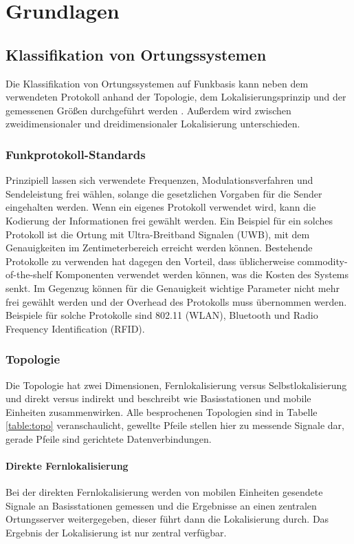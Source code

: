 \chapter{Grundlagen}
\label{ch:Grundlagen}

\section{Klassifikation von Ortungssystemen}
\label{ch:Einleitung:sec:Ortungssysteme}
Die Klassifikation von Ortungssystemen auf Funkbasis kann neben dem verwendeten Protokoll anhand der Topologie, dem Lokalisierungsprinzip und der gemessenen Größen durchgeführt werden \cite{liu2007survey}.
Außerdem wird zwischen zweidimensionaler und dreidimensionaler Lokalisierung unterschieden.

\subsection{Funkprotokoll-Standards}
Prinzipiell lassen sich verwendete Frequenzen, Modulationsverfahren und Sendeleistung frei wählen, solange die gesetzlichen Vorgaben für die Sender eingehalten werden. Wenn ein eigenes Protokoll verwendet wird, kann die Kodierung der Informationen frei gewählt werden. 
Ein Beispiel für ein solches Protokoll ist die Ortung mit Ultra-Breitband Signalen (UWB), mit dem Genauigkeiten im Zentimeterbereich erreicht werden können. Bestehende Protokolle zu verwenden hat dagegen den Vorteil, dass üblicherweise commodity-of-the-shelf Komponenten verwendet werden können, was die Kosten des Systems senkt. Im Gegenzug können für die Genauigkeit wichtige Parameter nicht mehr frei gewählt werden und der Overhead des Protokolls muss übernommen werden. Beispiele für solche Protokolle sind 802.11 (WLAN), Bluetooth und Radio Frequency Identification (RFID).

\subsection{Topologie}
Die Topologie hat zwei Dimensionen, Fernlokalisierung versus Selbstlokalisierung und direkt versus indirekt und beschreibt wie Basisstationen und mobile Einheiten zusammenwirken. 
Alle besprochenen Topologien sind in Tabelle \ref{table:topo} veranschaulicht, gewellte Pfeile stellen hier zu messende Signale dar, gerade Pfeile sind gerichtete Datenverbindungen.\\

\subsubsection{Direkte Fernlokalisierung} 
Bei der direkten Fernlokalisierung werden von mobilen Einheiten gesendete Signale an Basisstationen gemessen und die Ergebnisse an einen zentralen Ortungsserver weitergegeben, dieser führt dann die Lokalisierung durch. Das Ergebnis der Lokalisierung ist nur zentral verfügbar. \\


